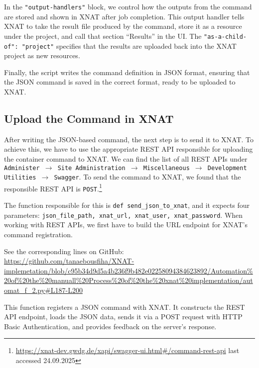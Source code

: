 In the \texttt{"output-handlers"} block, we control how the outputs from the command are stored and shown in XNAT after job completion. This output handler tells XNAT to take the result file produced by the command, store it as a resource under the project, and call that section ``Results'' in the UI. The \texttt{"as-a-child-of": "project"} specifies that the results are uploaded back into the XNAT project as new resources.

Finally, the script writes the command definition in JSON format, ensuring that the JSON command is saved in the correct format, ready to be uploaded to XNAT.

\subsection{Upload the Command in XNAT}

After writing the JSON-based command, the next step is to send it to XNAT. To achieve this, we have to use the appropriate REST API responsible for uploading the container command to XNAT.
We can find the list of all REST APIs under \texttt{Administer $\rightarrow$ Site Administration $\rightarrow$ Miscellaneous $\rightarrow$ Development Utilities $\rightarrow$ Swagger}.
To send the command to XNAT, we found that the responsible REST API is \texttt{POST}.\footnote{\url{https://xnat-dev.gwdg.de/xapi/swagger-ui.html\#/command-rest-api} last accessed 24.09.2025}

The function responsible for this is \texttt{def send\_json\_to\_xnat}, and it expects four parameters: \texttt{json\_file\_path, xnat\_url, xnat\_user, xnat\_password}. When working with REST APIs, we first have to build the URL endpoint for XNAT’s command registration.
 


\noindent\footnotesize See the corresponding lines on GitHub:\url{ https://github.com/tanaebousfiha/XNAT-implemetation/blob/c95b34d9d5a4b236f9b482e02258094384623892/Automation%20of%20the%20manuall%20Process%20of%20the%20xnat%20implementation/automat_f_2.py#L187-L200}
\normalsize

This function registers a JSON command with XNAT. It constructs the REST API endpoint, loads the JSON data, sends it via a POST request with HTTP Basic Authentication, and provides feedback on the server's response.

